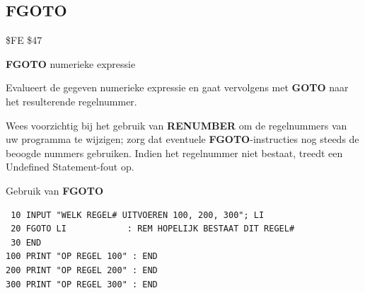 \subsection{FGOTO}
\begin{description}[leftmargin=2cm,style=nextline]
\item [Token:]    \$FE \$47
\item [Formaat:]   {\bf FGOTO} numerieke expressie\item [Gebruik:]    Evalueert de gegeven numerieke expressie en gaat vervolgens met {\bf GOTO} naar het resulterende regelnummer.

\item [Opmerkingen:]  Wees voorzichtig bij het gebruik van {\bf RENUMBER} om de regelnummers van uw programma te wijzigen; zorg dat eventuele {\bf FGOTO}-instructies nog steeds de beoogde nummers gebruiken. Indien het regelnummer niet bestaat, treedt een Undefined Statement-fout op.

\item [Voorbeeld:]  Gebruik van {\bf FGOTO}

\begin{tcolorbox}[colback=black,coltext=white]
\verbatimfont{\codefont}
\begin{verbatim}
 10 INPUT "WELK REGEL# UITVOEREN 100, 200, 300"; LI
 20 FGOTO LI            : REM HOPELIJK BESTAAT DIT REGEL#
 30 END
100 PRINT "OP REGEL 100" : END
200 PRINT "OP REGEL 200" : END
300 PRINT "OP REGEL 300" : END
\end{verbatim}
\end{tcolorbox}
\end{description}


\newpage
